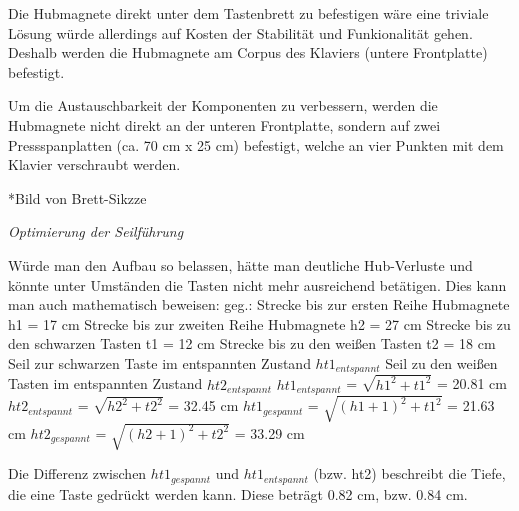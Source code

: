 \begin{enumerate}
Die Hubmagnete direkt unter dem Tastenbrett zu befestigen wäre eine triviale Lösung würde allerdings auf Kosten der Stabilität und Funkionalität gehen.
Deshalb werden die Hubmagnete am Corpus des Klaviers (untere Frontplatte) befestigt.

Um die Austauschbarkeit der Komponenten zu verbessern, werden die Hubmagnete nicht direkt an der unteren Frontplatte,
sondern auf zwei Pressspanplatten (ca. 70 cm x 25 cm) befestigt, welche an vier Punkten mit dem Klavier verschraubt werden.

*Bild von Brett-Sikzze

\textit{Optimierung der Seilführung}

Würde man den Aufbau so belassen, hätte man deutliche Hub-Verluste und könnte unter Umständen die Tasten nicht mehr ausreichend betätigen.
\newline
Dies kann man auch mathematisch beweisen:
\newline geg.:
\newline Strecke bis zur ersten Reihe Hubmagnete h1 = 17 cm
\newline Strecke bis zur zweiten Reihe Hubmagnete h2 = 27 cm
\newline Strecke bis zu den schwarzen Tasten t1 = 12 cm
\newline Strecke bis zu den weißen Tasten t2 = 18 cm
\newline Seil zur schwarzen Taste im entspannten Zustand $ht1_{entspannt}$
\newline Seil zu den weißen Tasten im entspannten Zustand $ht2_{entspannt}$
\newline $ht1_{entspannt}$ = $\sqrt {h1^{2} + t1^{2}}$ = 20.81 cm
\newline $ht2_{entspannt}$ = $\sqrt {h2^{2} + t2^{2}}$ = 32.45 cm
\newline $ht1_{gespannt}$ = $\sqrt {(h1 + 1) ^{2} + t1^{2}}$ = 21.63 cm
\newline $ht2_{gespannt}$ = $\sqrt {(h2 + 1)^{2} + t2^{2}}$ = 33.29 cm

Die Differenz zwischen $ht1_{gespannt}$ und $ht1_{entspannt}$ (bzw. ht2) beschreibt die Tiefe, die eine Taste gedrückt werden kann.
\newline Diese beträgt 0.82 cm, bzw. 0.84 cm.


\end{enumerate}
